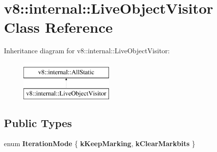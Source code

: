 \hypertarget{classv8_1_1internal_1_1LiveObjectVisitor}{}\section{v8\+:\+:internal\+:\+:Live\+Object\+Visitor Class Reference}
\label{classv8_1_1internal_1_1LiveObjectVisitor}
Inheritance diagram for v8\+:\+:internal\+:\+:Live\+Object\+Visitor\+:\begin{figure}[H]
\begin{center}
\leavevmode
\includegraphics[height=2.000000cm]{classv8_1_1internal_1_1LiveObjectVisitor}
\end{center}
\end{figure}
\subsection*{Public Types}
\begin{DoxyCompactItemize}
\item 
\mbox{\label{classv8_1_1internal_1_1LiveObjectVisitor_ab1c922908b4c4012ad95f31a4a4e3652}} 
enum {\bfseries Iteration\+Mode} \{ {\bfseries k\+Keep\+Marking}, 
{\bfseries k\+Clear\+Markbits}
 \}
\end{DoxyCompactItemize}
